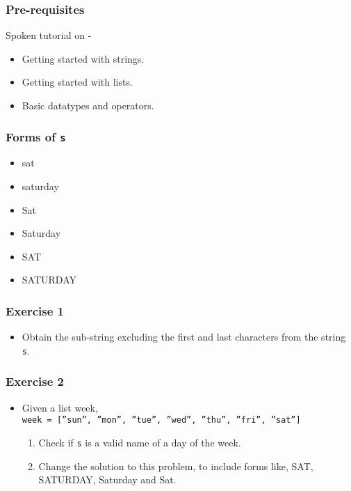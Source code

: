 \documentclass[17pt,compress]{beamer}
\begin{document}
\begin{frame}
\frametitle{Pre-requisites}
\label{sec-3}

Spoken tutorial on -
\begin{itemize}
\item Getting started with strings.\pause
\item Getting started with lists.\pause
\item Basic datatypes and operators.
\end{itemize}
\end{frame}
\begin{frame}
\frametitle{Forms of \texttt{s}}
\label{sec-4}
\begin{itemize}
\item sat
\item saturday
\item Sat
\item Saturday
\item SAT
\item SATURDAY
\end{itemize}
\end{frame}
\begin{frame}
\frametitle{Exercise 1}
\label{sec-5}


\begin{itemize}
\item Obtain the sub-string excluding the first and last characters from
  the string \texttt{s}.
\end{itemize}
\end{frame}
\begin{frame}
\frametitle{Exercise 2}
\label{sec-6}


\begin{itemize}
\item Given a list week,\\ {\small \texttt{week = [''sun'', ''mon'', ''tue'', ''wed'', ''thu'', ''fri'', ''sat'']}}\\\pause
\vspace{5pt}
\begin{enumerate}
\item Check if \texttt{s} is a valid name of a day of the
  week.\pause
\item Change the solution to this problem, to include forms like,
  SAT, SATURDAY, Saturday and Sat.
\end{enumerate}
\end{itemize}  
\end{frame}
\end{document}
